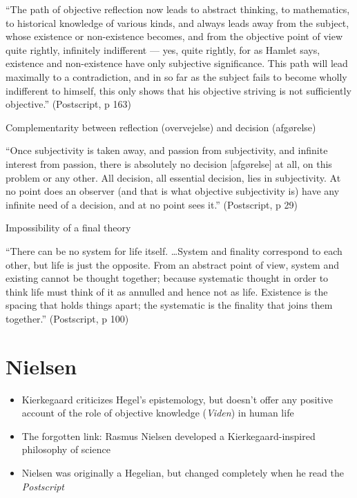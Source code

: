 \documentclass[ignorenonframetext, ]{beamer}
\begin{document}
\begin{frame}

  ``The path of objective reflection now leads to abstract thinking,
  to mathematics, to historical knowledge of various kinds, and always
  leads away from the subject, whose existence or non-existence
  becomes, and from the objective point of view quite rightly,
  infinitely indifferent --- yes, quite rightly, for as Hamlet says,
  existence and non-existence have only subjective significance. This
  path will lead maximally to a contradiction, and in so far as the
  subject fails to become wholly indifferent to himself, this only
  shows that his objective striving is not sufficiently objective.''
  (Postscript, p 163)

\end{frame}

\begin{frame}{Complementarity between reflection (overvejelse) and
    decision (afgørelse)}

  ``Once subjectivity is taken away, and passion from subjectivity,
  and infinite interest from passion, there is absolutely no decision
  [afgørelse] at all, on this problem or any other. All decision, all
  essential decision, lies in subjectivity. At no point does an
  observer (and that is what objective subjectivity is) have any
  infinite need of a decision, and at no point sees it.'' (Postscript,
  p 29)

\end{frame}

\begin{frame}{Impossibility of a final theory}

  ``There can be no system for life itself. \dots System and finality
  correspond to each other, but life is just the opposite. From an
  abstract point of view, system and existing cannot be thought
  together; because systematic thought in order to think life must
  think of it as annulled and hence not as life. Existence is the
  spacing that holds things apart; the systematic is the finality that
  joins them together.'' (Postscript, p 100)

\end{frame}

\section{Nielsen}


\begin{frame}

  \begin{itemize}
  \item Kierkegaard criticizes Hegel's epistemology, but doesn't offer
    any positive account of the role of objective knowledge
    (\emph{Viden}) in human life
  \item The forgotten link: Rasmus Nielsen developed a
    Kierkegaard-inspired philosophy of science
  \item Nielsen was originally a Hegelian, but changed completely when
    he read the \emph{Postscript}
  \end{itemize}

\end{frame}
\end{document}
